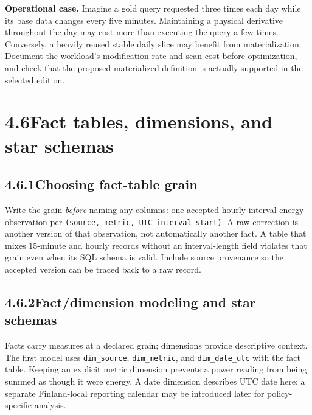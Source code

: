 \documentclass[11pt,twoside]{article}
\newcommand{\topic}[2]{\subsection*{#1\quad #2}}
\begin{document}
\textbf{Operational case.} Imagine a gold query requested three times each day while its base data changes every five minutes. Maintaining a physical derivative throughout the day may cost more than executing the query a few times. Conversely, a heavily reused stable daily slice may benefit from materialization. Document the workload's modification rate and scan cost before optimization, and check that the proposed materialized definition is actually supported in the selected edition.

\newpage
\section*{4.6\quad Fact tables, dimensions, and star schemas}
\topic{4.6.1}{Choosing fact-table grain}
Write the grain \emph{before} naming any columns: one accepted hourly interval-energy observation per \texttt{(source, metric, UTC interval start)}. A raw correction is another version of that observation, not automatically another fact. A table that mixes 15-minute and hourly records without an interval-length field violates that grain even when its SQL schema is valid. Include source provenance so the accepted version can be traced back to a raw record.

\topic{4.6.2}{Fact/dimension modeling and star schemas}
Facts carry measures at a declared grain; dimensions provide descriptive context. The first model uses \texttt{dim\_source}, \texttt{dim\_metric}, and \texttt{dim\_date\_utc} with the fact table. Keeping an explicit metric dimension prevents a power reading from being summed as though it were energy. A date dimension describes UTC date here; a separate Finland-local reporting calendar may be introduced later for policy-specific analysis.
\end{document}
